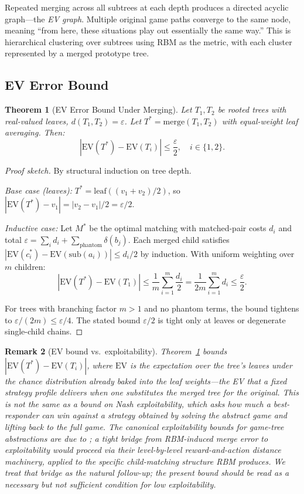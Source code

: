 \documentclass[11pt]{article}
\newtheorem{theorem}{Theorem}[section]
\newtheorem{remark}[theorem]{Remark}
\newcommand{\EV}{\mathrm{EV}}
\newcommand{\sub}{\mathrm{sub}}
\begin{document}
Repeated merging across all subtrees at each depth produces a
directed acyclic graph---the \emph{EV graph}. Multiple original game
paths converge to the same node, meaning ``from here, these situations
play out essentially the same way.'' This is hierarchical clustering
over subtrees using RBM as the metric, with each cluster represented by
a merged prototype tree.

\subsection{EV Error Bound}

\begin{theorem}[EV Error Bound Under Merging]
\label{thm:ev-error}
Let $T_1, T_2$ be rooted trees with real-valued leaves, $d(T_1, T_2) =
\varepsilon$. Let $T^* = \mathrm{merge}(T_1, T_2)$ with equal-weight
leaf averaging. Then:
\[
  |\EV(T^*) - \EV(T_i)| \le \frac{\varepsilon}{2}, \quad i \in \{1, 2\}.
\]
\end{theorem}

\begin{proof}[Proof sketch]
By structural induction on tree depth.

\emph{Base case (leaves):} $T^* = \mathrm{leaf}((v_1+v_2)/2)$, so
$|\EV(T^*) - v_1| = |v_2 - v_1|/2 = \varepsilon/2$.

\emph{Inductive case:} Let $M^*$ be the optimal matching with
matched-pair costs $d_i$ and total $\varepsilon = \sum_i d_i +
\sum_{\text{phantom}} \delta(b_j)$. Each merged child satisfies
$|\EV(c_i^*) - \EV(\sub(a_i))| \le d_i / 2$ by induction. With uniform
weighting over $m$ children:
\[
  |\EV(T^*) - \EV(T_1)| \le \frac{1}{m} \sum_{i=1}^m \frac{d_i}{2}
  = \frac{1}{2m} \sum_{i=1}^m d_i \le \frac{\varepsilon}{2}.
\]

For trees with branching factor $m > 1$ and no phantom terms, the bound
tightens to $\varepsilon / (2m) \le \varepsilon / 4$. The stated bound
$\varepsilon/2$ is tight only at leaves or degenerate single-child
chains.
\end{proof}

\begin{remark}[EV bound vs.\ exploitability]
\label{rem:ev-vs-expl}
Theorem~\ref{thm:ev-error} bounds $|\EV(T^*) - \EV(T_i)|$, where $\EV$
is the expectation over the tree's leaves under the chance distribution
already baked into the leaf weights---the EV that a fixed strategy
profile delivers when one substitutes the merged tree for the original.
This is \emph{not} the same as a bound on Nash exploitability, which
asks how much a best-responder can win against a strategy obtained by
solving the abstract game and lifting back to the full game. The
canonical exploitability bounds for game-tree abstractions are due to
\citet{kroer2014extensive,kroer2018unified}; a tight bridge from
RBM-induced merge error to exploitability would proceed via their
level-by-level reward-and-action distance machinery, applied to the
specific child-matching structure RBM produces.  We treat that bridge
as the natural follow-up; the present bound should be read as a
necessary but not sufficient condition for low exploitability.
\end{remark}
\end{document}
